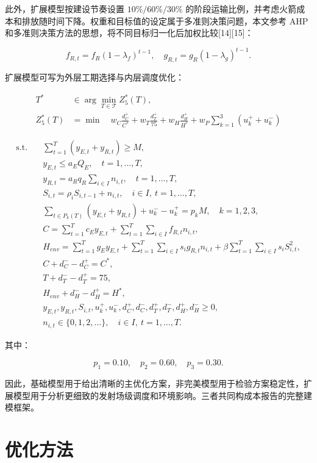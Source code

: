 \documentclass[12pt,a4paper,UTF8]{article}
\begin{document}
此外，扩展模型按建设节奏设置 \(10\%/60\%/30\%\) 的阶段运输比例，并考虑火箭成本和排放随时间下降。权重和目标值的设定属于多准则决策问题，本文参考 AHP 和多准则决策方法的思想，将不同目标归一化后加权比较[14][15]：

\[
f_{R,t}=f_R(1-\lambda_f)^{t-1},\quad
g_{R,t}=g_R(1-\lambda_g)^{t-1}.
\]

扩展模型可写为外层工期选择与内层调度优化：

\[
\begin{aligned}
T^* &\in \arg\min_{T\in\mathcal{T}} Z_5^*(T), \\
Z_5^*(T)
&=\min \quad
w_C\frac{d_C^+}{C^*}
+w_T\frac{d_T^+}{75}
+w_H\frac{d_H^+}{H^*}
+w_P\sum_{k=1}^{3}(u_k^++u_k^-)
\end{aligned}
\]

\[
\begin{aligned}
\text{s.t.}\quad
& \sum_{t=1}^{T}(y_{E,t}+y_{R,t})\ge M, \\
& y_{E,t}\le a_EQ_E,\quad t=1,\ldots,T, \\
& y_{R,t}=a_Rq_R\sum_{i\in I}n_{i,t},\quad t=1,\ldots,T, \\
& S_{i,t}=\rho_iS_{i,t-1}+n_{i,t},\quad i\in I,\ t=1,\ldots,T, \\
& \sum_{t\in P_k(T)}(y_{E,t}+y_{R,t})+u_k^- -u_k^+=p_kM,\quad k=1,2,3, \\
& C=\sum_{t=1}^{T}c_Ey_{E,t}+\sum_{t=1}^{T}\sum_{i\in I}f_{R,t}n_{i,t}, \\
& H_{env}=\sum_{t=1}^{T}g_Ey_{E,t}+\sum_{t=1}^{T}\sum_{i\in I}s_ig_{R,t}n_{i,t}
+\beta\sum_{t=1}^{T}\sum_{i\in I}s_iS_{i,t}^2, \\
& C+d_C^- -d_C^+=C^*, \\
& T+d_T^- -d_T^+=75, \\
& H_{env}+d_H^- -d_H^+=H^*, \\
& y_{E,t},y_{R,t},S_{i,t},u_k^+,u_k^-,d_C^+,d_C^-,d_T^+,d_T^-,d_H^+,d_H^-\ge0, \\
& n_{i,t}\in\{0,1,2,\ldots\},\quad i\in I,\ t=1,\ldots,T.
\end{aligned}
\]

其中：

\[
p_1=0.10,\quad p_2=0.60,\quad p_3=0.30.
\]

因此，基础模型用于给出清晰的主优化方案，非完美模型用于检验方案稳定性，扩展模型用于分析更细致的发射场级调度和环境影响。三者共同构成本报告的完整建模框架。

\clearpage
\section{优化方法}
\end{document}
